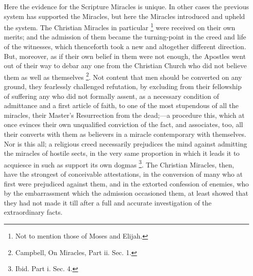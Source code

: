 Here the evidence for the Scripture Miracles is
unique. In other cases the previous system has supported the
Miracles, but here the Miracles introduced and upheld the system. The
Christian Miracles in particular \footnote{Not to mention those of Moses and Elijah.} were received on their own merits; and the admission of them
became the turning-point in the creed and life of the witnesses, which
thenceforth took a new and altogether different direction. But,
moreover, as if their own belief in them were not enough, the Apostles
went out of their way to debar any one from the Christian Church who
did not believe them as well as themselves \footnote{Campbell, On Miracles, Part ii. Sec. 1.}. Not content that men should be converted on any ground, they
fearlessly challenged refutation, by excluding from their fellowship
of suffering any who did not formally assent, as a necessary condition
of admittance and a first article of faith, to one of the most
stupendous of all the miracles, their Master's Resurrection from the
dead;—a procedure this, which at once evinces their own unqualified
conviction of the fact, and associates, too, all their converts with
them as believers in a miracle contemporary with themselves. Nor is
this all; a religious creed necessarily prejudices the mind against
admitting the miracles of hostile sects, in the very same proportion
in which it leads it to acquiesce in such as support its own dogmas \footnote{Ibid. Part i. Sec. 4.}. The Christian Miracles, then, have the strongest of
conceivable attestations, in the conversion of many who at first
were prejudiced against them, and in the extorted confession of
enemies, who by the embarrassment which the admission occasioned them,
at least showed that they had not made it till after a full and
accurate investigation of the extraordinary facts.

